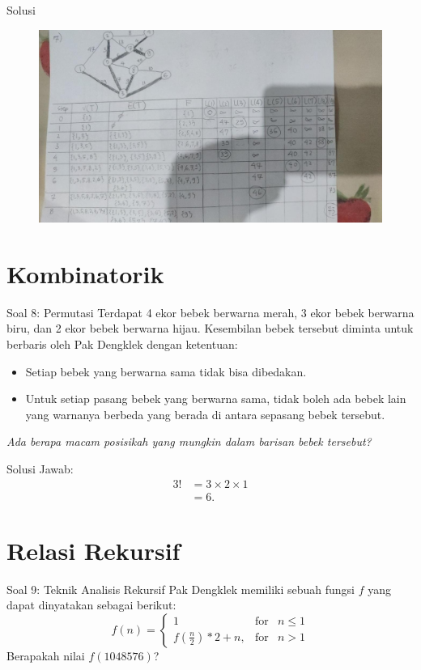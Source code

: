 \documentclass[english,t]{beamer}
\begin{document}
\begin{frame}{Solusi~\citep{epp2020discrete}}
\begin{figure}[!ht]
	\centering
	\includegraphics[scale=.275]{images/solusi-soal-7}
\end{figure}
\end{frame}

\section{Kombinatorik}
\begin{frame}{Soal 8: Permutasi}
Terdapat 4 ekor bebek berwarna merah, 3 ekor bebek berwarna biru, dan 2 ekor bebek berwarna hijau. Kesembilan bebek tersebut diminta untuk berbaris oleh Pak Dengklek dengan ketentuan:

\begin{itemize}
	\item Setiap bebek yang berwarna sama tidak bisa dibedakan.
	\item Untuk setiap pasang bebek yang berwarna sama, tidak boleh ada bebek lain yang warnanya berbeda yang berada di antara sepasang bebek tersebut.
\end{itemize}

\bigskip
\textit{Ada berapa macam posisikah yang mungkin dalam barisan bebek tersebut?}
\end{frame}

\begin{frame}{Solusi}
Jawab: 
\begin{align*}
	3! &= 3 \times 2 \times 1 \\
	   &= 6.
\end{align*}
\end{frame}

\section{Relasi Rekursif}
\begin{frame}{Soal 9: Teknik Analisis Rekursif}
Pak Dengklek memiliki sebuah fungsi $f$ yang dapat dinyatakan sebagai berikut:
\begin{equation*}
f(n) =
\left\{ \begin{array}{rcl}
1                       & \mbox{for} & n \leq 1 \\ 
f(\frac{n}{2}) * 2 + n, & \mbox{for} & n > 1
\end{array}\right.
\end{equation*}
Berapakah nilai $f(1048576)$?
\end{frame}
\end{document}
